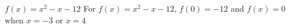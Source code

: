 {$f(x) = x^2 - x - 12$}
{ For $f(x) =  x^2-x-12$, $f(0) = -12$ and $f(x) = 0$ when $x = -3$ or $x=4$}